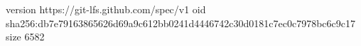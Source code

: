version https://git-lfs.github.com/spec/v1
oid sha256:db7e79163865626d69a9c612bb0241d4446742c30d0181c7ec0c7978bc6c9c17
size 6582
